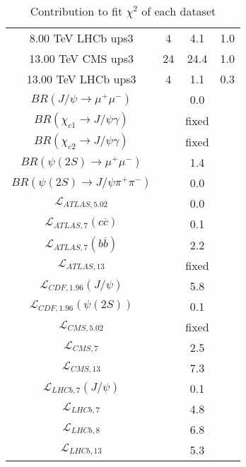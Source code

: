 \begin{table}[h!]
\begin{tabular}{c|c|c|c}
8.00 TeV LHCb ups3 & 4 & 4.1 & 1.0 \\
13.00 TeV CMS ups3 & 24 & 24.4 & 1.0 \\
13.00 TeV LHCb ups3 & 4 & 1.1 & 0.3 \\
\hline
$BR(J/\psi\rightarrow\mu^+\mu^-)$ &  & 0.0 &  \\
$BR(\chi_{c1}\rightarrow J/\psi\gamma)$ &  & fixed & \\
$BR(\chi_{c2}\rightarrow J/\psi\gamma)$ &  & fixed & \\
$BR(\psi(2S)\rightarrow\mu^+\mu^-)$ &  & 1.4 &  \\
$BR(\psi(2S)\rightarrow J/\psi\pi^+\pi^-)$ &  & 0.0 &  \\
$\mathcal L_{ATLAS,5.02}$ &  & 0.0 &  \\
$\mathcal L_{ATLAS,7}(c\overline c)$ &  & 0.1 &  \\
$\mathcal L_{ATLAS,7}(b\overline b)$ &  & 2.2 &  \\
$\mathcal L_{ATLAS,13}$ &  & fixed & \\
$\mathcal L_{CDF,1.96}(J/\psi)$ &  & 5.8 &  \\
$\mathcal L_{CDF,1.96}(\psi(2S))$ &  & 0.1 &  \\
$\mathcal L_{CMS,5.02}$ &  & fixed & \\
$\mathcal L_{CMS,7}$ &  & 2.5 &  \\
$\mathcal L_{CMS,13}$ &  & 7.3 &  \\
$\mathcal L_{LHCb,7}(J/\psi)$ &  & 0.1 &  \\
$\mathcal L_{LHCb,7}$ &  & 4.8 &  \\
$\mathcal L_{LHCb,8}$ &  & 6.8 &  \\
$\mathcal L_{LHCb,13}$ &  & 5.3 &  \\
\end{tabular}
\caption{Contribution to fit $\chi^2$ of each dataset}
\end{table}
